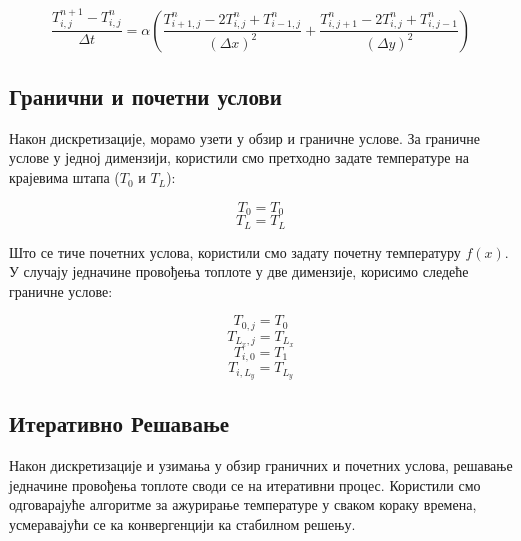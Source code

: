 \documentclass[a4paper,12pt]{article}
\begin{document}
	\[ \frac{T_{i,j}^{n+1} - T_{i,j}^{n}}{\Delta t} = \alpha \left( \frac{T_{i+1,j}^{n} - 2T_{i,j}^{n} + T_{i-1,j}^{n}}{(\Delta x)^2} + \frac{T_{i,j+1}^{n} - 2T_{i,j}^{n} + T_{i,j-1}^{n}}{(\Delta y)^2} \right) \]
	
	
	\subsection{Гранични и почетни услови}
	
	Након дискретизације, морамо узети у обзир и граничне услове. За граничне услове у једној димензији, користили смо претходно задате температуре на крајевима штапа (\(T_0\) и \(T_L\)):
	
	\[ T_0 = T_0 \]
	\[ T_L = T_L \]
	
	Што се тиче почетних услова, користили смо задату почетну температуру \( f(x) \).\\
	
	
	У случају једначине провођења топлоте у две димензије, корисимо следеће граничне услове:
	
	\[ T_{0,j} = T_0 \]
	\[ T_{L_x,j} = T_{L_x} \]
	\[ T_{i,0} = T_1 \]
	\[ T_{i,L_y} = T_{L_y} \]
	
	\subsection{Итеративно Решавање}
	
	Након дискретизације и узимања у обзир граничних и почетних услова, решавање једначине провођења топлоте своди се на итеративни процес. Користили смо одговарајуће алгоритме за ажурирање температуре у сваком кораку времена, усмеравајући се ка конвергенцији ка стабилном решењу.
	
	
\end{document}
